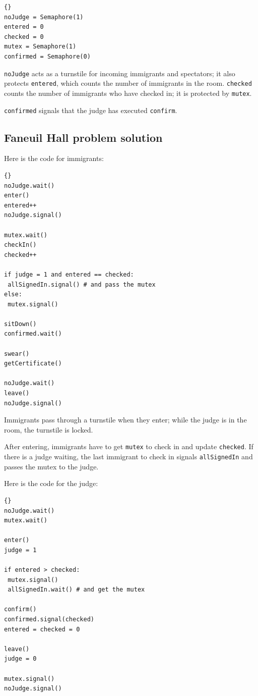 \documentclass{book}
\begin{document}
\begin{lstlisting}[title={Faneuil Hall problem hint}]{}
noJudge = Semaphore(1)
entered = 0
checked = 0
mutex = Semaphore(1)
confirmed = Semaphore(0)
\end{lstlisting}

{\tt noJudge} acts as a turnstile for incoming immigrants and
spectators; it also protects {\tt entered}, which counts the
number of immigrants in the room.  {\tt checked} counts the
number of immigrants who have checked in; it is protected by
    {\tt mutex}.

{\tt confirmed} signals that the judge has executed {\tt confirm}.



\subsection {Faneuil Hall problem solution}

Here is the code for immigrants:

\newpage
\begin{lstlisting}[title={Faneuil Hall problem solution (immigrant)}]{}
noJudge.wait()
enter()
entered++
noJudge.signal()

mutex.wait()
checkIn()
checked++

if judge = 1 and entered == checked:
 allSignedIn.signal() # and pass the mutex
else:
 mutex.signal()

sitDown()
confirmed.wait()

swear()
getCertificate()

noJudge.wait()
leave()
noJudge.signal()
\end{lstlisting}

Immigrants pass through a turnstile when they enter; while the
judge is in the room, the turnstile is locked.

After entering, immigrants have to get {\tt mutex} to check
in and update {\tt checked}.  If there is a judge waiting, the
last immigrant to check in signals {\tt allSignedIn} and passes
the mutex to the judge.

Here is the code for the judge:

\begin{lstlisting}[title={Faneuil Hall problem solution (judge)}]{}
noJudge.wait()
mutex.wait()

enter()
judge = 1

if entered > checked:
 mutex.signal()
 allSignedIn.wait() # and get the mutex

confirm()
confirmed.signal(checked)
entered = checked = 0

leave()
judge = 0

mutex.signal()
noJudge.signal()
\end{lstlisting}
\end{document}
